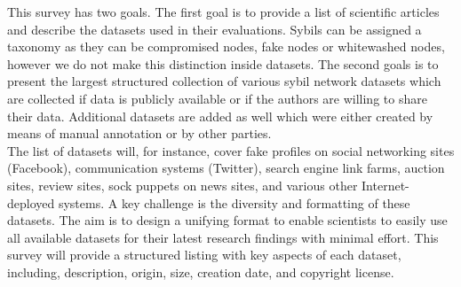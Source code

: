	This survey has two goals.
	The first goal is to provide a list of scientific articles and describe the datasets used in their evaluations.
	Sybils can be assigned a taxonomy as they can be compromised nodes, fake nodes \cite{newsome2004sybil} or whitewashed nodes, however we do not make this distinction inside datasets.  
	The second goals is to present the largest structured collection of various sybil network datasets which are collected if data is publicly available or if the authors are willing to share their data. 
	Additional datasets are added as well which were either created by means of manual annotation or by other parties.\\
	The list of datasets will, for instance, cover fake profiles on social networking sites (Facebook), communication systems (Twitter), search engine link farms, auction sites, review sites, sock puppets on news sites, and various other Internet-deployed systems. 
	A key challenge is the diversity and formatting of these datasets. 
	The aim is to design a unifying format to enable scientists to easily use all available datasets for their latest research findings with minimal effort.
	This survey will provide a structured listing with key aspects of each dataset, including, description, origin, size, creation date, and copyright license.

